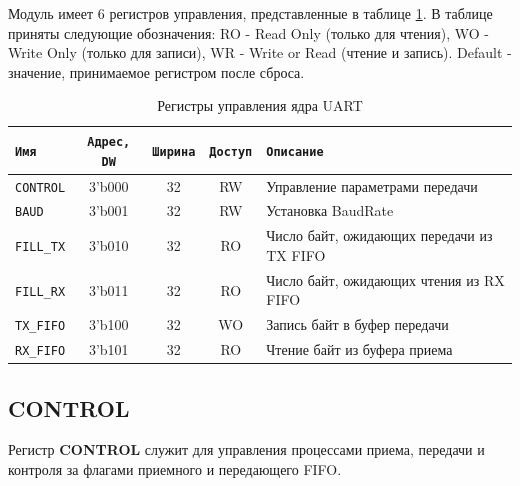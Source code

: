 \documentclass[a4paper,12pt]{article}
\begin{document}
Модуль имеет 6 регистров управления, представленные в таблице {\ref{tbl:uart_regs}}. В таблице приняты следующие обозначения: RO - Read Only (только для чтения), WO - Write Only (только для записи), WR - Write or Read (чтение и запись). Default - значение, принимаемое регистром после сброса.

\begin{table}[H]
  \begin{center}
    \begin{tabular}{l|c|c|c|l}
      \rowcolor[gray]{0.7} {\tt Имя} & {\tt Адрес, DW} & {\tt Ширина} & {\tt Доступ} & {\tt Описание} \\ \hline \hline
      {\tt CONTROL}   & 3'b000 & 32 & RW & Управление параметрами передачи\\ \hline
      {\tt BAUD}      & 3'b001 & 32 & RW & Установка BaudRate\\ \hline
      {\tt FILL\_TX}  & 3'b010 & 32 & RO & Число байт, ожидающих передачи из TX FIFO\\ \hline
      {\tt FILL\_RX}  & 3'b011 & 32 & RO & Число байт, ожидающих чтения из RX FIFO\\ \hline
      {\tt TX\_FIFO}   & 3'b100 & 32 & WO & Запись байт в буфер передачи\\ \hline
      {\tt RX\_FIFO}   & 3'b101 & 32 & RO & Чтение байт из буфера приема\\ \hline
    \end{tabular}
    \caption{Регистры управления ядра UART}
    \label{tbl:uart_regs}
    \end{center}
\end{table}

\subsection{CONTROL}

Регистр \textbf{CONTROL} служит для управления процессами приема, передачи и контроля за флагами приемного и передающего FIFO.
\end{document}
